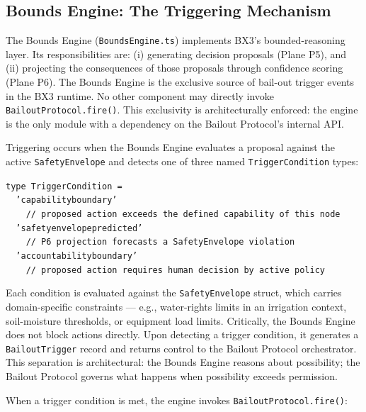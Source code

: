 \subsection{Bounds Engine: The Triggering Mechanism}
\label{sec:bounds-engine-trigger}

The Bounds Engine (\texttt{BoundsEngine.ts}) implements BX3's bounded-reasoning layer. Its responsibilities are: (i) generating decision proposals (Plane P5), and (ii) projecting the consequences of those proposals through confidence scoring (Plane P6). The Bounds Engine is the exclusive source of bail-out trigger events in the BX3 runtime. No other component may directly invoke \texttt{BailoutProtocol.fire()}. This exclusivity is architecturally enforced: the engine is the only module with a dependency on the Bailout Protocol's internal API.

Triggering occurs when the Bounds Engine evaluates a proposal against the active \texttt{SafetyEnvelope} and detects one of three named \texttt{TriggerCondition} types:

\medskip
\noindent
\texttt{type\ TriggerCondition\ =}\\
\noindent
\texttt{\ \ 'capability\textunderscore boundary'}\\
\texttt{\ \ \ \ //\ proposed\ action\ exceeds\ the\ defined\ capability\ of\ this\ node}\\
\texttt{\ \ 'safety\textunderscore envelope\textunderscore predicted'}\\
\texttt{\ \ \ \ //\ P6\ projection\ forecasts\ a\ SafetyEnvelope\ violation}\\
\texttt{\ \ 'accountability\textunderscore boundary'}\\
\texttt{\ \ \ \ //\ proposed\ action\ requires\ human\ decision\ by\ active\ policy}

\medskip
\noindent
Each condition is evaluated against the \texttt{SafetyEnvelope} struct, which carries domain-specific constraints --- e.g., water-rights limits in an irrigation context, soil-moisture thresholds, or equipment load limits. Critically, the Bounds Engine does not block actions directly. Upon detecting a trigger condition, it generates a \texttt{BailoutTrigger} record and returns control to the Bailout Protocol orchestrator. This separation is architectural: the Bounds Engine reasons about possibility; the Bailout Protocol governs what happens when possibility exceeds permission.

When a trigger condition is met, the engine invokes \texttt{BailoutProtocol.fire()}:


